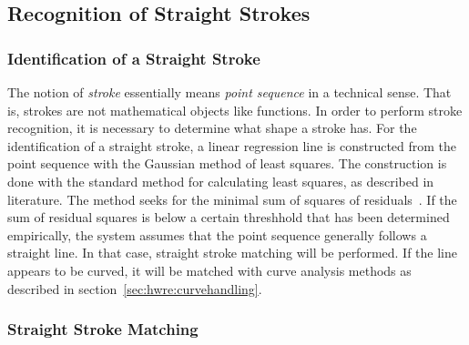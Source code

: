 \subsection{Recognition of Straight Strokes}
\label{sec:hwre:straightstrokes}

\subsubsection{Identification of a Straight Stroke}
\label{sec:hwre:identificationstraightstroke}

The notion of \emph{stroke} essentially means \emph{point sequence} in a 
technical sense. That is, strokes are not mathematical objects like functions.
In order to perform stroke recognition, it is necessary to determine what shape 
a stroke has. For the identification of a straight stroke, a linear regression 
line is constructed from the point sequence with the Gaussian method of 
least squares. The construction is done with the standard method for 
calculating least squares, as described in literature. The method seeks for the 
minimal sum of squares of residuals~. 
If the sum of residual squares is below 
a certain threshhold that has been determined empirically, 
the system assumes that the point 
sequence generally follows a straight line. In that case, straight stroke 
matching will be performed. If the line appears to be curved, it will be matched
with curve analysis methods as described in 
section~\ref{sec:hwre:curvehandling}. 

\subsubsection{Straight Stroke Matching}
\label{sec:hwre:straightstrokematching}

